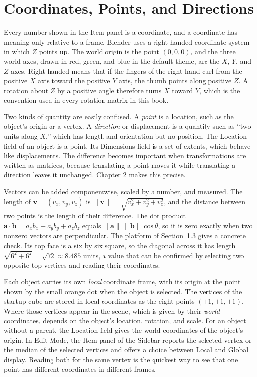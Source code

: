 \section{Coordinates, Points, and Directions}

Every number shown in the Item panel is a coordinate, and a coordinate has meaning only relative to a frame. Blender uses a right-handed coordinate system in which $Z$ points up. The world origin is the point $(0,0,0)$, and the three world axes, drawn in red, green, and blue in the default theme, are the $X$, $Y$, and $Z$ axes. Right-handed means that if the fingers of the right hand curl from the positive $X$ axis toward the positive $Y$ axis, the thumb points along positive $Z$. A rotation about $Z$ by a positive angle therefore turns $X$ toward $Y$, which is the convention used in every rotation matrix in this book.

Two kinds of quantity are easily confused. A \emph{point} is a location, such as the object's origin or a vertex. A \emph{direction} or displacement is a quantity such as ``two units along $X$,'' which has length and orientation but no position. The Location field of an object is a point. Its Dimensions field is a set of extents, which behave like displacements. The difference becomes important when transformations are written as matrices, because translating a point moves it while translating a direction leaves it unchanged. Chapter 2 makes this precise.

Vectors can be added componentwise, scaled by a number, and measured. The length of $\mathbf v=(v_x,v_y,v_z)$ is $\|\mathbf v\|=\sqrt{v_x^2+v_y^2+v_z^2}$, and the distance between two points is the length of their difference. The dot product $\mathbf a\cdot\mathbf b=a_xb_x+a_yb_y+a_zb_z$ equals $\|\mathbf a\|\,\|\mathbf b\|\cos\theta$, so it is zero exactly when two nonzero vectors are perpendicular. The platform of Section~1.3 gives a concrete check. Its top face is a six by six square, so the diagonal across it has length $\sqrt{6^2+6^2}=\sqrt{72}\approx 8.485$ units, a value that can be confirmed by selecting two opposite top vertices and reading their coordinates.

Each object carries its own \emph{local} coordinate frame, with its origin at the point shown by the small orange dot when the object is selected. The vertices of the startup cube are stored in local coordinates as the eight points $(\pm1,\pm1,\pm1)$. Where those vertices appear in the scene, which is given by their \emph{world} coordinates, depends on the object's location, rotation, and scale. For an object without a parent, the Location field gives the world coordinates of the object's origin. In Edit Mode, the Item panel of the Sidebar reports the selected vertex or the median of the selected vertices and offers a choice between Local and Global display. Reading both for the same vertex is the quickest way to see that one point has different coordinates in different frames.

